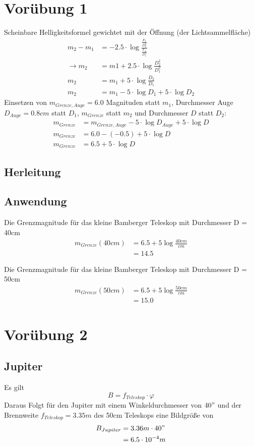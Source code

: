 \documentclass[titlepage]{scrartcl}
\begin{document}
\section{Vorübung 1}
Scheinbare Helligkeitsformel gewichtet mit der Öffnung (der Lichtsammelfläche)
\begin{align*}
m_2-m_1&=-2.5 \cdot\log \frac{\frac{F_2}{D_2^2}}{\frac{F_1}{D_1^2}}\\
\rightarrow m_2&=m1+2.5\cdot\log\frac{D_2^2}{D_1^2}\\
m_2&=m_1+5\cdot \log \frac{D_2}{D_1}\\
m_2&=m_1-5\cdot\log D_1 +5\cdot\log D_2
\end{align*}
Einsetzen von $m_{Grenze,Auge}=6.0$ Magnituden statt $m_1$, Durchmesser Auge $D_{Auge} = 0.8cm$ statt $D_1$, $m_{Grenze}$ statt $m_2$ und Durchmesser $D$ statt $D_2$:
\begin{align*}
m_{Grenze}&=m_{Grenze, Auge}-5\cdot\log D_{Auge} +5\cdot\log D\\
m_{Grenze}&=6.0-(-0.5) +5\cdot\log D\\
m_{Grenze}&=6.5 + 5\cdot \log D
\end{align*}
\subsection{Herleitung}
\subsection{Anwendung}
Die Grenzmagnitude für das kleine Bamberger Teleskop mit Durchmesser D = 40cm
\begin{align*}
m_{Grenze} (40cm)&= 6.5 + 5 \log \frac{40cm}{cm}\\
&= 14.5
\end{align*}

Die Grenzmagnitude für das kleine Bamberger Teleskop mit Durchmesser D = 50cm
\begin{align*}
m_{Grenze} (50cm)&= 6.5 + 5 \log \frac{50cm}{cm}\\
&= 15.0
\end{align*}
\section{Vorübung 2}
\subsection{Jupiter}
Es gilt
\begin{equation*}
B = f_{Teleskop}\cdot \varphi
\end{equation*}
Daraus Folgt für den Jupiter mit einem Winkeldurchmesser von $40"$ und der Brennweite $f_{Teleskop}=3.35m$ des 50cm Teleskops eine Bildgröße von
\begin{align*}
B_{Jupiter}&=3.36m \cdot 40"\\
&= 6.5 \cdot 10^{-4} m
\end{align*}
\end{document}
